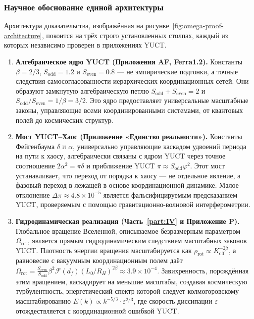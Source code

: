 \documentclass[11pt,a4paper]{article}
\begin{document}
	\subsubsection*{Научное обоснование единой архитектуры}
	
	Архитектура доказательства, изображённая на рисунке~\ref{fig:omega-proof-architecture}, покоится на трёх строго установленных столпах, каждый из которых независимо проверен в приложениях YUCT.
	
	\begin{enumerate}
		\item \textbf{Алгебраическое ядро YUCT (Приложения AF, Ferra1.2).} Константы \(\beta = 2/3\), \(S_{\mathrm{odd}}=1.2\) и \(S_{\mathrm{even}}=0.8\) — не эмпирические подгонки, а точные следствия самосогласованности иерархических координационных сетей. Они образуют замкнутую алгебраическую петлю \(S_{\mathrm{odd}}+S_{\mathrm{even}}=2\) и \(S_{\mathrm{odd}}/S_{\mathrm{even}} = 1/\beta = 3/2\). Это ядро предоставляет универсальные масштабные законы, управляющие всеми координированными системами, от квантовых полей до космических структур.
		
		\item \textbf{Мост YUCT–Хаос (Приложение «Единство реальности»).} Константы Фейгенбаума \(\delta\) и \(\alpha\), универсально управляющие каскадом удвоений периода на пути к хаосу, алгебраически связаны с ядром YUCT через точное соотношение \(2\alpha^2 = \pi\delta\) и приближение YUCT \(\pi \approx S_{\mathrm{odd}}\varphi^2\). Этот мост устанавливает, что переход от порядка к хаосу — не отдельное явление, а фазовый переход в лежащей в основе координационной динамике. Малое отклонение \(\Delta\pi \approx 4.8\times10^{-5}\) является фальсифицируемым предсказанием YUCT, проверяемым с помощью гравитационно-волновой интерферометрии.
		
		\item \textbf{Гидродинамическая реализация (Часть~\ref{part:IV} и Приложение P).} Глобальное вращение Вселенной, описываемое безразмерным параметром \(\Omega_{\mathrm{rot}}\), является прямым гидродинамическим следствием масштабных законов YUCT. Плотность энергии вращения масштабируется как \(\rho_{\mathrm{rot}} \propto K_{\mathrm{eff}}^{-2\beta}\), а равновесие с вакуумным координационным полем даёт \(\Omega_{\mathrm{rot}} = \frac{S_{\mathrm{even}}}{S_{\mathrm{odd}}} \beta^2 \mathcal{F}(d_f) (L_0/R_H)^{2\beta} \approx 3.9\times10^{-4}\). Завихренность, порождённая этим вращением, каскадирует на меньшие масштабы, создавая космическую турбулентность, энергетический спектр которой следует колмогоровскому масштабированию \(E(k) \propto k^{-5/3} \cdot \varepsilon^{2/3}\), где скорость диссипации \(\varepsilon\) отождествляется с координационной ошибкой YUCT.
	\end{enumerate}
	
\end{document}
